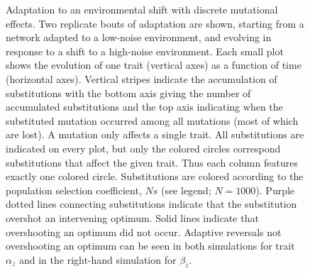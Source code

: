 \documentclass[dvips,12pt,twoside,titlepage]{article}
\begin{document}
\begin{figure}
\begin{center}
\caption{Adaptation to an environmental shift with discrete mutational effects. Two replicate bouts of adaptation are shown, starting from a network adapted to a low-noise environment, and evolving in response to a shift to a high-noise environment. Each small plot shows the evolution of one trait (vertical axes) as a function of time (horizontal axes). Vertical stripes indicate the accumulation of substitutions with the bottom axis giving the number of accumulated substitutions and the top axis indicating when the substituted mutation occurred among all mutations (most of which are lost). A mutation only affects a single trait. All substitutions are indicated on every plot, but only the colored circles correspond substitutions that affect the given trait. Thus each column features exactly one colored circle. Substitutions are colored according to the population selection coefficient, $Ns$ (see legend; $N=1000$). Purple dotted lines connecting substitutions indicate that the substitution overshot an intervening optimum. Solid lines indicate that overshooting an optimum did not occur. Adaptive reversals not overshooting an optimum can be seen in both simulations for trait $\alpha_{z}$ and in the right-hand simulation for $\beta_{z}$. \vspace{0.6cm}}
\label{Simulation}
\end{center}
\end{figure}
\end{document}
